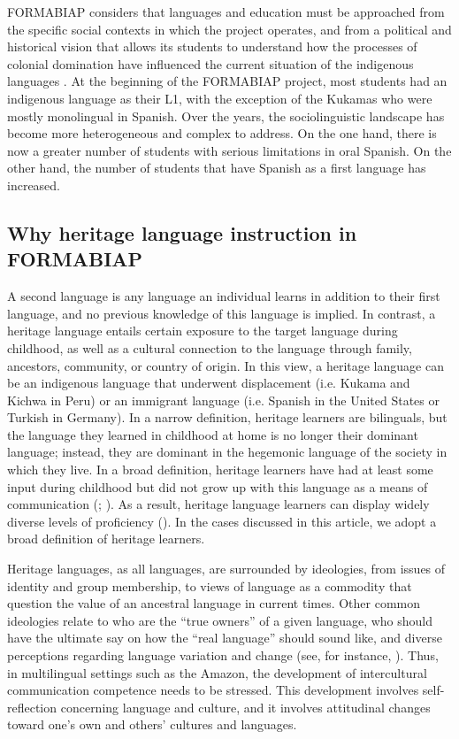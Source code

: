 \documentclass[output=paper]{langscibook}
\begin{document}
FORMABIAP considers that languages and education must be approached from the specific social contexts in which the project operates, and from a political and historical vision that allows its students to understand how the processes of colonial domination have influenced the current situation of the indigenous languages \citep[38]{TrapnellEtAl2018}. At the beginning of the FORMABIAP project, most students had an indigenous language as their L1, with the exception of the Kukamas who were mostly monolingual in Spanish. Over the years, the sociolinguistic landscape has become more heterogeneous and complex to address. On the one hand, there is now a greater number of students with serious limitations in oral Spanish. On the other hand, the number of students that have Spanish as a first language has increased.

\subsection{Why heritage language instruction in FORMABIAP}

A second language is any language an individual learns in addition to their first language, and no previous knowledge of this language is implied. In contrast, a heritage language entails certain exposure to the target language during childhood, as well as a cultural connection to the language through family, ancestors, community, or country of origin. In this view, a heritage language can be an indigenous language that underwent displacement (i.e. Kukama and Kichwa in Peru) or an immigrant language (i.e. Spanish in the United States or Turkish in Germany). In a narrow definition, heritage learners are bilinguals, but the language they learned in childhood at home is no longer their dominant language; instead, they are dominant in the hegemonic language of the society in which they live. In a broad definition, heritage learners have had at least some input during childhood but did not grow up with this language as a means of communication (\citealt{PolinskyKagan2007}; \citealt{Rothman2009}). As a result, heritage language learners can display widely diverse levels of proficiency (\citealt{Valdés1989,Valdés2005}). In the cases discussed in this article, we adopt a broad definition of heritage learners.

Heritage languages, as all languages, are surrounded by ideologies, from issues of identity and group membership, to views of language as a commodity that question the value of an ancestral language in current times. Other common ideologies relate to who are the “true owners” of a given language, who should have the ultimate say on how the “real language” should sound like, and diverse perceptions regarding language variation and change (see, for instance,  \citealt{LopezOdango2015}). Thus, in multilingual settings such as the Amazon, the development of intercultural communication competence needs to be stressed. This development involves self-reflection concerning language and culture, and it involves attitudinal changes toward one’s own and others’ cultures and languages.
\end{document}
